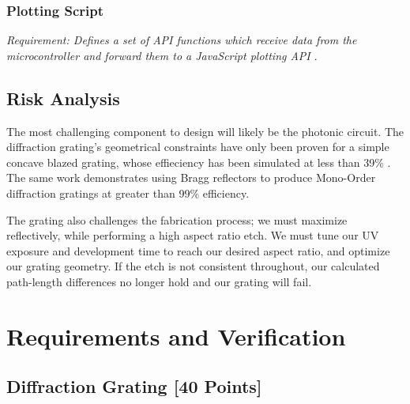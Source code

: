 \documentclass{article}
\begin{document}
        \subsubsection{Plotting Script}
            \textit{Requirement: Defines a set of API functions which receive data from the microcontroller and forward them to a JavaScript plotting API \cite{ESP32/ESP8266Tutorials}}.
    
            
    \subsection{Risk Analysis}
    The most challenging component to design will likely be the photonic circuit. The diffraction grating's geometrical constraints have only been proven for a simple concave blazed grating, whose effieciency has been simulated at less than 39\% \cite{Packirisamy2013DesignMirrors, Packirisamy2012Mono-OrderGrating, Pottier2014IntegratedInsulator}. The same work demonstrates using Bragg reflectors to produce Mono-Order diffraction gratings at greater than 99\% efficiency. 
    
    The grating also challenges the fabrication process; we must maximize reflectively, while performing a high aspect ratio etch. We must tune our UV exposure and development time to reach our desired aspect ratio, and optimize our grating geometry. If the etch is not consistent throughout, our calculated path-length differences no longer hold and our grating will fail.
    


\section{Requirements and Verification}
\subsection{Diffraction Grating [40 Points]}

     { 
                }
                
\end{document}
